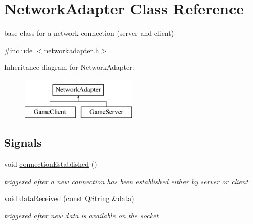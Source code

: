 \hypertarget{classNetworkAdapter}{\section{\-Network\-Adapter \-Class \-Reference}
\label{classNetworkAdapter}
}


base class for a network connection (server and client)  




{\ttfamily \#include $<$networkadapter.\-h$>$}

\-Inheritance diagram for \-Network\-Adapter\-:\begin{figure}[H]
\begin{center}
\leavevmode
\includegraphics[height=2.000000cm]{classNetworkAdapter}
\end{center}
\end{figure}
\subsection*{\-Signals}
\begin{DoxyCompactItemize}
\item 
\hypertarget{classNetworkAdapter_a2da2230a1cdf125105537d7a5b143bd0}{void \hyperlink{classNetworkAdapter_a2da2230a1cdf125105537d7a5b143bd0}{connection\-Established} ()}\label{classNetworkAdapter_a2da2230a1cdf125105537d7a5b143bd0}

\begin{DoxyCompactList}\small\item\em triggered after a new connection has been established either by server or client \end{DoxyCompactList}\item 
\hypertarget{classNetworkAdapter_ac2e6cce84f774b166dfda66e98ee655e}{void \hyperlink{classNetworkAdapter_ac2e6cce84f774b166dfda66e98ee655e}{data\-Received} (const \-Q\-String \&data)}\label{classNetworkAdapter_ac2e6cce84f774b166dfda66e98ee655e}

\begin{DoxyCompactList}\small\item\em triggered after new data is available on the socket \end{DoxyCompactList}\end{DoxyCompactItemize}
